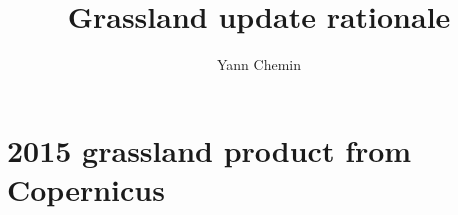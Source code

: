 \documentclass[10pt,a4paper,draft]{report}
\author{Yann Chemin}
\title{Grassland update rationale}
\begin{document}
\maketitle
\chapter{2015 grassland product from Copernicus}
\end{document}
